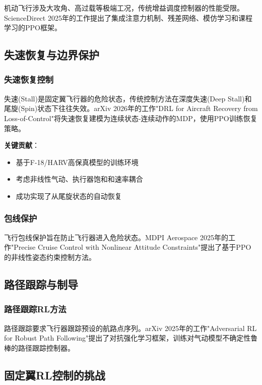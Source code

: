 \documentclass[12pt,a4paper]{ctexart}
\begin{document}
机动飞行涉及大攻角、高过载等极端工况，传统增益调度控制器的性能受限。ScienceDirect 2025年的工作提出了集成注意力机制、残差网络、模仿学习和课程学习的PPO框架。

\subsection{失速恢复与边界保护}

\subsubsection{失速恢复控制}

失速(Stall)是固定翼飞行器的危险状态，传统控制方法在深度失速(Deep Stall)和尾旋(Spin)状态下往往失效。arXiv 2026年的工作"DRL for Aircraft Recovery from Loss-of-Control"将失速恢复建模为连续状态-连续动作的MDP，使用PPO训练恢复策略。

\textbf{关键贡献}：
\begin{itemize}
    \item 基于F-18/HARV高保真模型的训练环境
    \item 考虑非线性气动、执行器饱和和速率耦合
    \item 成功实现了从尾旋状态的自动恢复
\end{itemize}

\subsubsection{包线保护}

飞行包线保护旨在防止飞行器进入危险状态。MDPI Aerospace 2025年的工作"Precise Cruise Control with Nonlinear Attitude Constraints"提出了基于PPO的非线性姿态约束控制方法。

\subsection{路径跟踪与制导}

\subsubsection{路径跟踪RL方法}

路径跟踪要求飞行器跟踪预设的航路点序列。arXiv 2025年的工作"Adversarial RL for Robust Path Following"提出了对抗强化学习框架，训练对气动模型不确定性鲁棒的路径跟踪控制器。

\subsection{固定翼RL控制的挑战}
\end{document}
